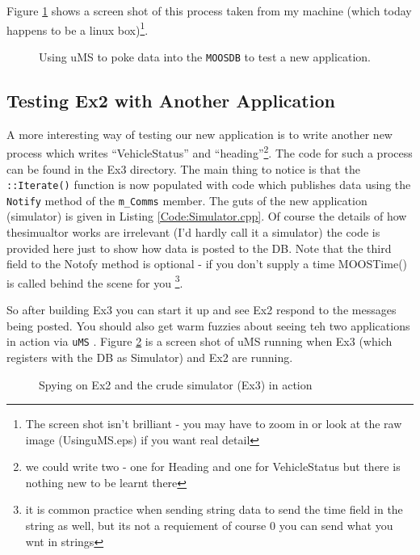 \documentclass[a4paper,10pt]{article}
\newcommand{\Code}[1]{\texttt{#1} }
\newcommand{\code}[1]{\Code{#1} }
\begin{document}
Figure \ref{Fig:UsinguMS} shows a screen shot of this process taken from my machine (which today happens to be a linux box)\footnote{ The screen shot isn't brilliant  - you may have to zoom in or look at the raw image (UsinguMS.eps) if you want real detail}.

\begin{figure}\label{Fig:UsinguMS}
\centering
{}
\caption{Using uMS to poke data into the \code{MOOSDB} to test a new application.}
\end{figure}

\subsection{Testing Ex2 with Another Application}\label{Sec:VehicleSimulator}

A more interesting way of testing our new application is to write another new process which writes ``VehicleStatus'' and ``heading''\footnote{we could write two - one for Heading and one for VehicleStatus but there is nothing new to be learnt there}. The code for such a process can be found in the Ex3 directory. The main thing to notice is that the \code{::Iterate()} function is now populated with code which publishes data using the \code{Notify} method of the \code{m\_Comms} member. The guts of the new application (simulator) is given in Listing \ref{Code:Simulator.cpp}. Of course the details of how thesimualtor works are irrelevant (I'd hardly call it a simulator) the code is provided here just to show how data is posted to the DB. Note that the third field to the Notofy method is optional - if you don't supply a time MOOSTime() is called behind the scene for you \footnote{it is common practice when sending string data to send the time field in the string as well, but its not a requiement of course 0 you can send what you wnt in strings}.



So after building Ex3  you can start it up and see Ex2 respond to the messages being posted. You should also get warm fuzzies about seeing teh two applications in action via \code{uMS}. Figure \ref{Fig:UsingSim} is a screen shot of uMS running when Ex3 (which registers with the DB as Simulator) and Ex2 are running.

\begin{figure}\label{Fig:UsingSim}
\centering
{}
\caption{Spying on Ex2 and the crude simulator (Ex3) in action}
\end{figure}
\end{document}
